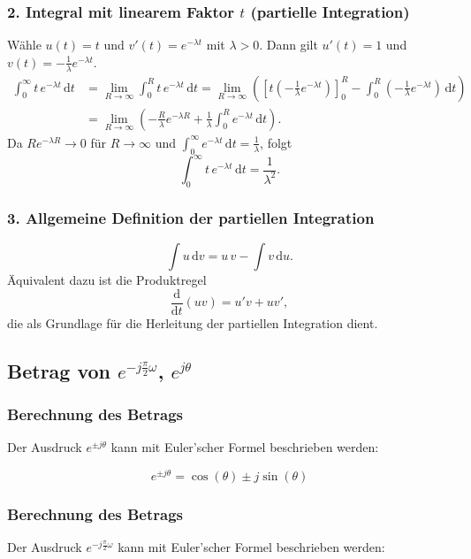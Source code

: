 \documentclass[12pt]{article}
\begin{document}
\subsubsection*{2. Integral mit linearem Faktor \(t\) (partielle Integration)}
Wähle \(u(t)=t\) und \(v'(t)=e^{-\lambda t}\) mit \(\lambda>0\). Dann gilt \(u'(t)=1\) und \(v(t)=-\frac{1}{\lambda}e^{-\lambda t}\).
\begin{align*}
\int_0^{\infty} t\,e^{-\lambda t}\,\mathrm{d}t
&= \lim_{R\to\infty}\int_0^{R} t\,e^{-\lambda t}\,\mathrm{d}t
= \lim_{R\to\infty}\left(\left[t\left(-\frac{1}{\lambda}e^{-\lambda t}\right)\right]_{0}^{R} - \int_0^{R}\left(-\frac{1}{\lambda}e^{-\lambda t}\right)\,\mathrm{d}t\right)\\
&= \lim_{R\to\infty}\left(-\frac{R}{\lambda}e^{-\lambda R} + \frac{1}{\lambda}\int_0^{R} e^{-\lambda t}\,\mathrm{d}t\right).
\end{align*}
Da \(R e^{-\lambda R}\to 0\) für \(R\to\infty\) und \(\int_0^{\infty} e^{-\lambda t}\,\mathrm{d}t=\frac{1}{\lambda}\), folgt
\[
\int_0^{\infty} t\,e^{-\lambda t}\,\mathrm{d}t = \frac{1}{\lambda^2}.
\]

\subsubsection*{3. Allgemeine Definition der partiellen Integration}
\[
\int u\,\mathrm{d}v = u\,v - \int v\,\mathrm{d}u.
\]
Äquivalent dazu ist die Produktregel
\[
\frac{\mathrm{d}}{\mathrm{d}t}(u v) = u'v + u v',
\]
die als Grundlage für die Herleitung der partiellen Integration dient.

\subsection{Betrag von \(e^{-j \frac{\pi}{2} \omega}\), \(e^{j \theta}\)}

\subsubsection{Berechnung des Betrags}
Der Ausdruck \(e^{\pm j \theta}\) kann mit Euler’scher Formel beschrieben werden:

\[
e^{\pm j \theta} = \cos\left(\theta\right) \pm j \sin\left(\theta\right)
\]

\subsubsection{Berechnung des Betrags}
Der Ausdruck \(e^{-j \frac{\pi}{2} \omega}\) kann mit Euler’scher Formel beschrieben werden:
\end{document}
